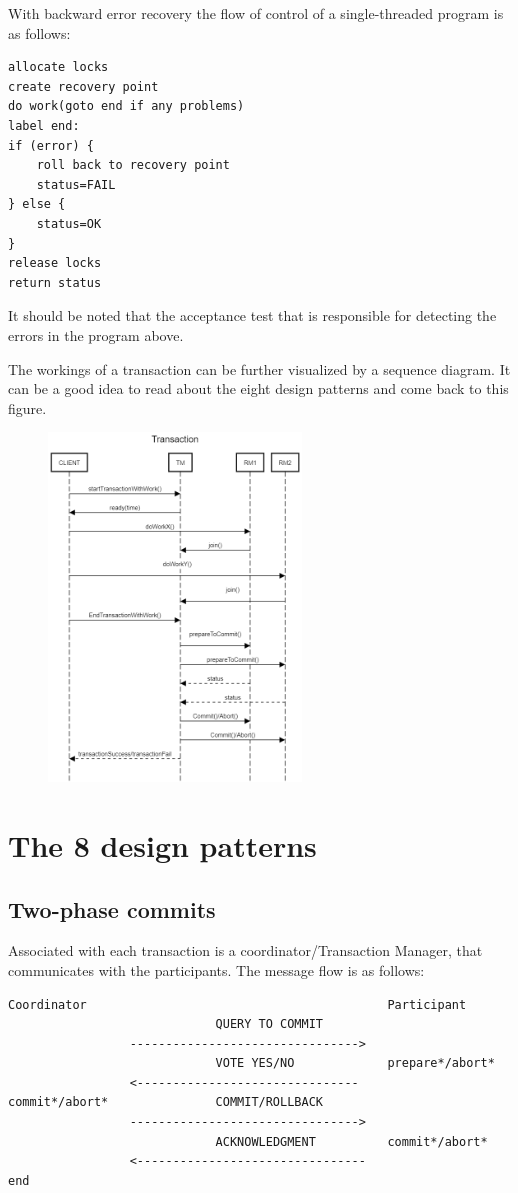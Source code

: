 With backward error recovery the flow of control of a single-threaded program is as follows:
\begin{verbatim}
allocate locks
create recovery point
do work(goto end if any problems)
label end:
if (error) {
	roll back to recovery point
    status=FAIL
} else {
    status=OK
}
release locks
return status
\end{verbatim}
It should be noted that the acceptance test that is responsible for detecting the errors in the program above.

The workings of a transaction can be further visualized by a sequence diagram. It can be a good idea to read about the eight design patterns and come back to this figure. 
\begin{figure}[H]
\centering
\includegraphics[width=0.6\textwidth]{figures/Fault_Tolerance/TransactionSequence.png}
\end{figure}

\section{The 8 design patterns}
\subsection{Two-phase commits}
Associated with each transaction is a coordinator/Transaction Manager, that communicates with the participants. The message flow is as follows:
\begin{verbatim}
Coordinator                                          Participant
                             QUERY TO COMMIT
                 -------------------------------->
                             VOTE YES/NO             prepare*/abort*
                 <-------------------------------
commit*/abort*               COMMIT/ROLLBACK
                 -------------------------------->
                             ACKNOWLEDGMENT          commit*/abort*
                 <--------------------------------  
end
\end{verbatim}
